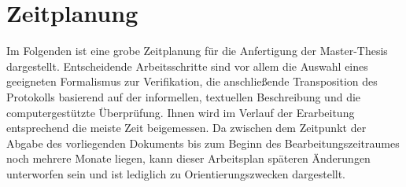 \section{Zeitplanung}

Im Folgenden ist eine grobe Zeitplanung für die Anfertigung der Master-Thesis dargestellt.
Entscheidende Arbeitsschritte sind vor allem die Auswahl eines geeigneten Formalismus zur Verifikation, die anschließende Transposition des Protokolls basierend auf der informellen, textuellen Beschreibung und die computergestützte Überprüfung. 
Ihnen wird im Verlauf der Erarbeitung entsprechend die meiste Zeit beigemessen.
Da zwischen dem Zeitpunkt der Abgabe des vorliegenden Dokuments bis zum Beginn des Bearbeitungszeitraumes noch mehrere Monate liegen, kann dieser Arbeitsplan späteren Änderungen unterworfen sein und ist lediglich zu Orientierungszwecken dargestellt.\\


